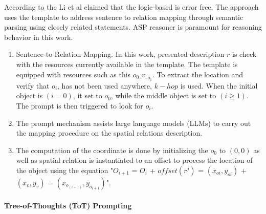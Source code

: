 \documentclass{article}
\begin{document}
According to the Li et al \cite{li2024} claimed that the logic-based is error free. The approach uses the template to address sentence to relation mapping through semantic parsing using closely related statements. ASP reasoner is paramount for reasoning behavior in this work. 

\begin{enumerate}
    \item Sentence-to-Relation Mapping. In this work, presented description $r$ is check with the resources currently available in the template. The template is equipped with resources such as this $o_{0}\_v\__{o_1}$. To extract the location and verify that $o_{i}$, has not been used anywhere, $k-hop$ is used. When the initial object is $(i = 0)$, it set to $o_{0}$, while the middle object is set to $(i\geq1)$. The prompt is then triggered to look for $o_{i}$.
    \item The prompt mechanism assists large language models (LLMs) to carry out the mapping procedure on the spatial relations description.
    \item The computation of the coordinate is done by initializing the $o_{0}$ to $(0,0)$ as well as spatial relation is instantiated  to an offset to process the location of the object using the equation "$O_{i+1}$ = $O_{i}$ + $offset(r^j)$ = $(x_{oi}, y_{oi})$ + $(x_{v}, y_{v})$ = $(x_{o_(i+1)}, y_{o_{i+1}})$". 
\end{enumerate}

\paragraph{Tree-of-Thoughts (ToT) Prompting}
\end{document}
